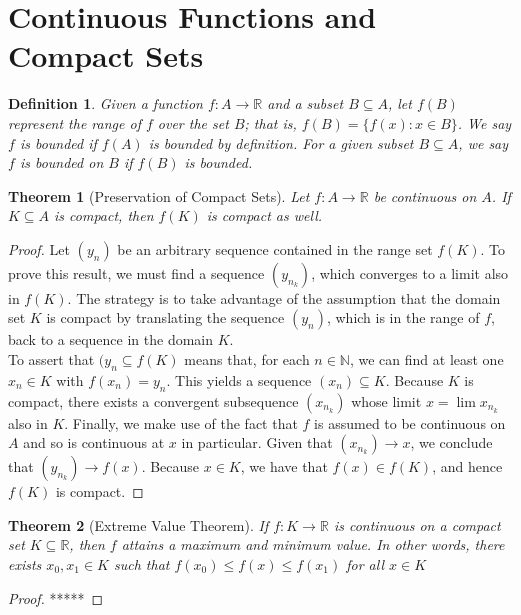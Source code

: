 \documentclass[10pt]{report}
\newtheorem{thm2}{Theorem}[section]
\newtheorem{def2}{Definition}[section]
\begin{document}
\section{Continuous Functions and Compact Sets}
\begin{def2}
Given a function $f:A\to\mathbb{R}$ and a subset $B\subseteq A$, let $f(B)$ represent the range of $f$ over the set $B$; that is, $f(B)=\{f(x):x\in B\}$. We say $f$ is bounded if $f(A)$ is bounded by definition. For a given subset $B\subseteq A$, we say $f$ is bounded on $B$ if $f(B)$ is bounded.
\end{def2}
\begin{thm2}[Preservation of Compact Sets]
Let $f:A\to\mathbb{R}$ be continuous on $A$. If $K\subseteq A$ is compact, then $f(K)$ is compact as well.
\end{thm2}
\begin{proof}
Let $(y_n)$ be an arbitrary sequence contained in the range set $f(K)$. To prove this result, we must find a sequence $(y_{n_k})$, which converges to a limit also in $f(K)$. The strategy is to take advantage of the assumption that the domain set $K$ is compact by translating the sequence $(y_n)$, which is in the range of $f$, back to a sequence in the domain $K$.\\
To assert that $(y_n\subseteq f(K)$ means that, for each $n\in\mathbb{N}$, we can find at least one $x_n\in K$ with $f(x_n)=y_n$. This yields a sequence $(x_n)\subseteq K$. Because $K$ is compact, there exists a convergent subsequence $(x_{n_k})$ whose limit $x=\lim x_{n_k}$ also in $K$. Finally, we make use of the fact that $f$ is assumed to be continuous on $A$ and so is continuous at $x$ in particular. Given that $(x_{n_k})\to x$, we conclude that $(y_{n_k})\to f(x)$. Because $x\in K$, we have that $f(x)\in f(K)$, and hence $f(K)$ is compact.
\end{proof}
\begin{thm2}[Extreme Value Theorem]
If $f:K\to\mathbb{R}$ is continuous on a compact set $K\subseteq \mathbb{R}$, then $f$ attains a maximum and minimum value. In other words, there exists $x_0, x_1 \in K$ such that $f(x_0)\leq f(x) \leq f(x_1)$ for all $x\in K$
\end{thm2}
\begin{proof}
*****
\end{proof}
\end{document}
